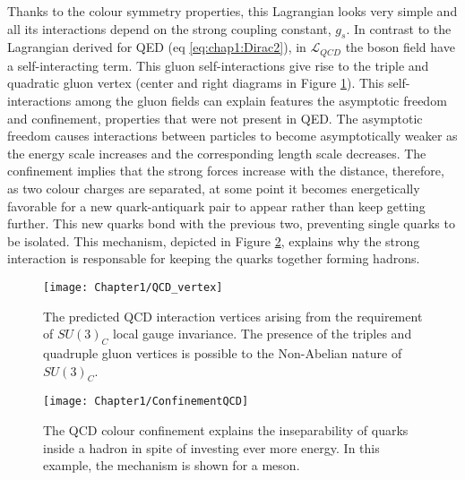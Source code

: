 Thanks to the colour symmetry properties, this Lagrangian looks very simple and all its interactions depend on the strong coupling
constant, $g_s$. In contrast to the Lagrangian derived for QED (eq \ref{eq:chap1:Dirac2}), in $\mathcal{L}_{QCD}$ the boson field 
have a self-interacting term. This gluon self-interactions give rise to the triple and quadratic gluon vertex (center and right diagrams in Figure \ref{fig:Chap1:gluonvertex}).
This self-interactions among the gluon fields can explain features the asymptotic freedom and confinement, properties that were not
present in QED. The asymptotic freedom causes interactions between particles to become asymptotically weaker as the energy 
scale increases and the corresponding length scale decreases. The confinement implies that the strong forces increase with the distance, therefore, 
as two colour charges are separated, at some point it becomes energetically favorable for a new quark-antiquark pair to appear rather than keep
getting further. This new quarks bond with the previous two, preventing single quarks to be isolated. This mechanism, depicted in Figure \ref{fig:Chap1:colorConfinement},
explains why the strong interaction is responsable for keeping the quarks together forming hadrons.

\begin{figure}
    \centering
    \texttt{[image: Chapter1/QCD\_vertex]}
    \caption{The predicted QCD interaction vertices arising from the requirement of $SU(3)_C$ local gauge invariance. The presence of the triples and quadruple gluon vertices is possible to the Non-Abelian nature of $SU(3)_C$.}
    \label{fig:Chap1:gluonvertex}
\end{figure}

\begin{figure}
    \centering
    \texttt{[image: Chapter1/ConfinementQCD]}
    \caption{The QCD colour confinement explains the inseparability of quarks inside a hadron in spite of investing ever more energy. In this example, the mechanism is shown for a meson.}
\label{fig:Chap1:colorConfinement}\end{figure}




